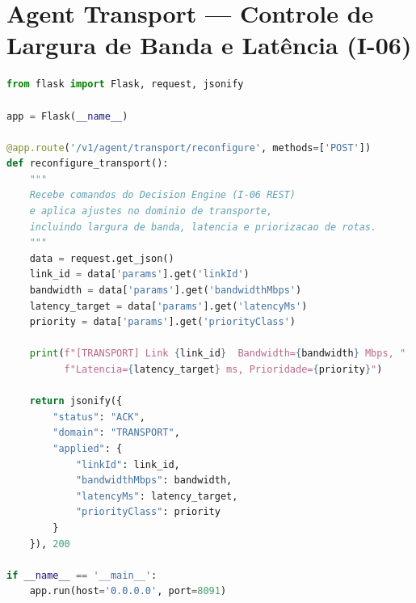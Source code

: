 \section{Agent Transport — Controle de Largura de Banda e Latência (I-06)}
\begin{lstlisting}[language=Python, caption={Função do Agent Transport para ajuste de largura de banda, latência e priorização de rotas.}, label={lst:agent_transport}]
from flask import Flask, request, jsonify

app = Flask(__name__)

@app.route('/v1/agent/transport/reconfigure', methods=['POST'])
def reconfigure_transport():
    """
    Recebe comandos do Decision Engine (I-06 REST)
    e aplica ajustes no dominio de transporte,
    incluindo largura de banda, latencia e priorizacao de rotas.
    """
    data = request.get_json()
    link_id = data['params'].get('linkId')
    bandwidth = data['params'].get('bandwidthMbps')
    latency_target = data['params'].get('latencyMs')
    priority = data['params'].get('priorityClass')

    print(f"[TRANSPORT] Link {link_id}  Bandwidth={bandwidth} Mbps, "
          f"Latencia={latency_target} ms, Prioridade={priority}")

    return jsonify({
        "status": "ACK",
        "domain": "TRANSPORT",
        "applied": {
            "linkId": link_id,
            "bandwidthMbps": bandwidth,
            "latencyMs": latency_target,
            "priorityClass": priority
        }
    }), 200

if __name__ == '__main__':
    app.run(host='0.0.0.0', port=8091)
\end{lstlisting}

